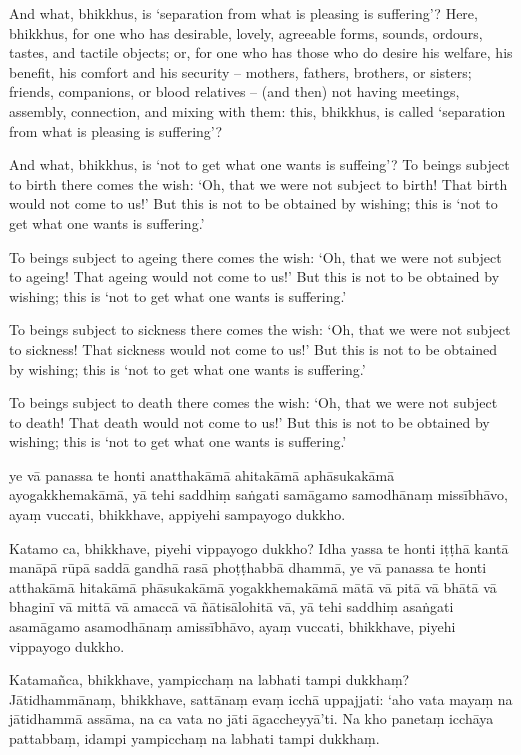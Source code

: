 And what, bhikkhus, is `separation from what is pleasing is suffering'? Here,
bhikkhus, for one who has desirable, lovely, agreeable forms, sounds, ordours,
tastes, and tactile objects; or, for one who has those who do desire his
welfare, his benefit, his comfort and his security -- mothers, fathers,
brothers, or sisters; friends, companions, or blood relatives -- (and then) not
having meetings, assembly, connection, and mixing with them: this, bhikkhus, is
called `separation from what is pleasing is suffering'?

And what, bhikkhus, is `not to get what one wants is suffeing'? To beings
subject to birth there comes the wish: `Oh, that we were not subject to birth!
That birth would not come to us!' But this is not to be obtained by wishing;
this is `not to get what one wants is suffering.'

To beings subject to ageing there comes the wish: `Oh, that we were not subject
to ageing! That ageing would not come to us!' But this is not to be obtained by
wishing; this is `not to get what one wants is suffering.'

To beings subject to sickness there comes the wish: `Oh, that we were not
subject to sickness! That sickness would not come to us!' But this is not to be
obtained by wishing; this is `not to get what one wants is suffering.'

To beings subject to death there comes the wish: `Oh, that we were not subject
to death! That death would not come to us!' But this is not to be obtained by
wishing; this is `not to get what one wants is suffering.'

\paliPage

ye vā panassa te honti anatthakāmā ahitakāmā aphāsukakāmā ayogakkhemakāmā, yā
tehi saddhiṃ saṅgati samāgamo samodhānaṃ missībhāvo, ayaṃ vuccati, bhikkhave,
appiyehi sampayogo dukkho.

Katamo ca, bhikkhave, piyehi vippayogo dukkho? Idha yassa te honti iṭṭhā kantā
manāpā rūpā saddā gandhā rasā phoṭṭhabbā dhammā, ye vā panassa te honti
atthakāmā hitakāmā phāsukakāmā yogakkhemakāmā mātā vā pitā vā bhātā vā bhaginī
vā mittā vā amaccā vā ñātisālohitā vā, yā tehi saddhiṃ asaṅgati asamāgamo
asamodhānaṃ amissībhāvo, ayaṃ vuccati, bhikkhave, piyehi vippayogo dukkho.

Katamañca, bhikkhave, yampicchaṃ na labhati tampi dukkhaṃ? Jātidhammānaṃ,
bhikkhave, sattānaṃ evaṃ icchā uppajjati: ‘aho vata mayaṃ na jātidhammā assāma,
na ca vata no jāti āgaccheyyā’ti. Na kho panetaṃ icchāya pattabbaṃ, idampi
yampicchaṃ na labhati tampi dukkhaṃ.

